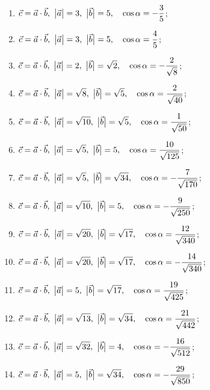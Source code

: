 	\begin{enumerate}
		\setcounter{enumi}{\value{tasks}}
	
			\item \( \displaystyle \vec{c} = \vec{a} \cdot \vec{b}, ~ \bigl\vert \vec{a} \bigr\vert = 3, ~ \bigl\vert \vec{b} \bigr\vert = 5, \quad \cos{\alpha} = -\frac{3}{5} \);
			\item \( \displaystyle \vec{c} = \vec{a} \cdot \vec{b}, ~ \bigl\vert \vec{a} \bigr\vert = 3, ~ \bigl\vert \vec{b} \bigr\vert = 5, \quad \cos{\alpha} = \frac{4}{5} \);
			\item \( \displaystyle \vec{c} = \vec{a} \cdot \vec{b}, ~ \bigl\vert \vec{a} \bigr\vert = 2, ~ \bigl\vert \vec{b} \bigr\vert = \sqrt{2}, \quad \cos{\alpha} = -\frac{2}{ \sqrt{8} } \);
			\item \( \displaystyle \vec{c} = \vec{a} \cdot \vec{b}, ~ \bigl\vert \vec{a} \bigr\vert = \sqrt{8}, ~ \bigl\vert \vec{b} \bigr\vert = \sqrt{5}, \quad \cos{\alpha} = \frac{2}{ \sqrt{40} } \);
			\item \( \displaystyle \vec{c} = \vec{a} \cdot \vec{b}, ~ \bigl\vert \vec{a} \bigr\vert = \sqrt{10}, ~ \bigl\vert \vec{b} \bigr\vert = \sqrt{5}, \quad \cos{\alpha} = \frac{1}{ \sqrt{50} } \);
			\item \( \displaystyle \vec{c} = \vec{a} \cdot \vec{b}, ~ \bigl\vert \vec{a} \bigr\vert = \sqrt{5}, ~ \bigl\vert \vec{b} \bigr\vert = 5, \quad \cos{\alpha} = \frac{10}{ \sqrt{125} } \);
			\item \( \displaystyle \vec{c} = \vec{a} \cdot \vec{b}, ~ \bigl\vert \vec{a} \bigr\vert = \sqrt{5}, ~ \bigl\vert \vec{b} \bigr\vert = \sqrt{34}, \quad \cos{\alpha} = -\frac{7}{ \sqrt{170} } \);
			\item \( \displaystyle \vec{c} = \vec{a} \cdot \vec{b}, ~ \bigl\vert \vec{a} \bigr\vert = \sqrt{10}, ~ \bigl\vert \vec{b} \bigr\vert = 5, \quad \cos{\alpha} = -\frac{9}{ \sqrt{250} } \);
			\item \( \displaystyle \vec{c} = \vec{a} \cdot \vec{b}, ~ \bigl\vert \vec{a} \bigr\vert = \sqrt{20}, ~ \bigl\vert \vec{b} \bigr\vert = \sqrt{17}, \quad \cos{\alpha} = \frac{12}{ \sqrt{340} } \);
			\item \( \displaystyle \vec{c} = \vec{a} \cdot \vec{b}, ~ \bigl\vert \vec{a} \bigr\vert = \sqrt{20}, ~ \bigl\vert \vec{b} \bigr\vert = \sqrt{17}, \quad \cos{\alpha} = -\frac{14}{ \sqrt{340} } \);
			\item \( \displaystyle \vec{c} = \vec{a} \cdot \vec{b}, ~ \bigl\vert \vec{a} \bigr\vert = 5, ~ \bigl\vert \vec{b} \bigr\vert = \sqrt{17}, \quad \cos{\alpha} = \frac{19}{ \sqrt{425} } \);
			\item \( \displaystyle \vec{c} = \vec{a} \cdot \vec{b}, ~ \bigl\vert \vec{a} \bigr\vert = \sqrt{13}, ~ \bigl\vert \vec{b} \bigr\vert = \sqrt{34}, \quad \cos{\alpha} = \frac{21}{ \sqrt{442} } \);
			\item \( \displaystyle \vec{c} = \vec{a} \cdot \vec{b}, ~ \bigl\vert \vec{a} \bigr\vert = \sqrt{32}, ~ \bigl\vert \vec{b} \bigr\vert = 4, \quad \cos{\alpha} = -\frac{16}{ \sqrt{512} } \);
			\item \( \displaystyle \vec{c} = \vec{a} \cdot \vec{b}, ~ \bigl\vert \vec{a} \bigr\vert = 5, ~ \bigl\vert \vec{b} \bigr\vert = \sqrt{34}, \quad \cos{\alpha} = -\frac{29}{ \sqrt{850} } \);

		\setcounter{tasks}{\value{enumi}}
	\end{enumerate}

